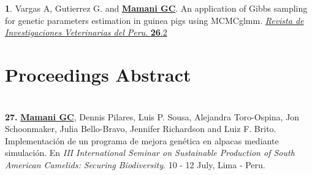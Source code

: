 \documentclass[margin,line,10pt]{res}
\newenvironment{list1}{
  \begin{list}{\ding{113}}{%
      \setlength{\itemsep}{0in}
      \setlength{\parsep}{0in} \setlength{\parskip}{0in}
      \setlength{\topsep}{0in} \setlength{\partopsep}{0in} 
      \setlength{\leftmargin}{0.17in}}}{\end{list}}
\begin{document}
\begin{resume}
\section{}

\begin{list1}
\item [{\bf 1}.]  Vargas A, Gutierrez G. and {\bf \underline{Mamani GC}}.  
 An application of Gibbs sampling for genetic parameters estimation in guinea pigs using MCMCglmm.   
     \textcolor{black}{\href{http://dev.scielo.org.pe/scielo.php?script=sci_arttext&pid=S1609-91172015000200003&lng=en&nrm=iso}{{\it Revista de Investigaciones Veterinarias del Peru}. {\bf 26}.2 } } 
\end{list1}
\vspace{0.5cm}




\vspace{0.5cm}
\section{\sc Proceedings Abstract}
\vspace{0.9cm}

\section{}

\begin{list1}

\item [\bf{27}.] {\bf \underline{Mamani GC}}, Dennis Pilares, Luis P. Sousa, Alejandra Toro-Ospina, Jon Schoonmaker, Julia Bello-Bravo, Jennifer Richardson and Luiz F. Brito.
Implementación de un programa de mejora genética en alpacas mediante simulación. En {\it
III International Seminar on Sustainable Production of South American Camelids: Securing Biodiversity}. 10 - 12 July, Lima - Peru. 

\vspace{0.5cm}

\end{list1}

\section{}

\begin{list1}


\end{list1}
\end{resume}
\end{document}
